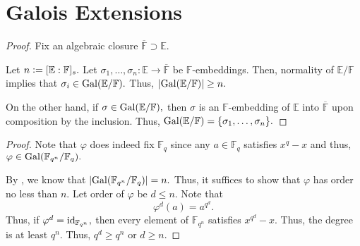 \section{Galois Extensions}
\orderofgalgroup*\label{prop:orderofgalgroup2}
\begin{flushright}\hyperref[prop:orderofgalgroup]{\upsym}\end{flushright}
\begin{proof}
    Fix an algebraic closure $\overline{\mathbb{F}} \supset \mathbb{E}.$ 

    Let $n \vcentcolon= [\mathbb{E} : \mathbb{F}]_s.$ Let $\sigma_1, \ldots, \sigma_n : \mathbb{E} \to \overline{\mathbb{F}}$ be $\mathbb{F}$-embeddings. Then, normality of $\mathbb{E}/\mathbb{F}$ implies that $\sigma_i \in \operatorname{Gal}(\mathbb{E}/\mathbb{F}).$ Thus, ${\left\lvert \operatorname{Gal}(\mathbb{E}/\mathbb{F}) \right\lvert} \ge n.$

    On the other hand, if $\sigma \in \operatorname{Gal}(\mathbb{E}/\mathbb{F}),$ then $\sigma$ is an $\mathbb{F}$-embedding of $\mathbb{E}$ into $\overline{\mathbb{F}}$ upon composition by the inclusion. Thus, $\operatorname{Gal}(\mathbb{E}/\mathbb{F}) = \{\sigma_1, \ldots, \sigma_n\}.$
\end{proof}

\frobgenerates*\label{prop:frobgenerates2}
\begin{flushright}\hyperref[prop:frobgenerates]{\upsym}\end{flushright}
\begin{proof}
    Note that $\varphi$ does indeed fix $\mathbb{F}_q$ since any $a \in \mathbb{F}_q$ satisfies $x^q - x$ and thus, $\varphi \in \operatorname{Gal}(\mathbb{F}_{q^n}/\mathbb{F}_q).$

    By , we know that ${\left\lvert \operatorname{Gal}(\mathbb{F}_{q^n}/\mathbb{F}_q) \right\lvert} = n.$ Thus, it suffices to show that $\varphi$ has order no less than $n.$ Let order of $\varphi$ be $d \le n.$ Note that
    \begin{equation*} 
        \varphi^d(a) = a^{q^d}.
    \end{equation*}
    Thus, if $\varphi^d = \operatorname{id}_{\mathbb{F}_{q^n}},$ then every element of $\mathbb{F}_{q^n}$ satisfies $x^{q^d} - x.$ Thus, the degree is at least $q^n.$ Thus, $q^d \ge q^n$ or $d \ge n.$
\end{proof}

